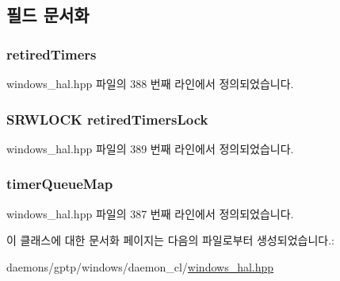 \subsection{필드 문서화}
\subsubsection[{\texorpdfstring{retired\+Timers}{retiredTimers}}]{ retired\+Timers\hspace{0.3cm}{\ttfamily [private]}}\hypertarget{class_windows_timer_queue_a1d247e5dc6ff5761a49ce7376ae9277d}{}\label{class_windows_timer_queue_a1d247e5dc6ff5761a49ce7376ae9277d}


windows\+\_\+hal.\+hpp 파일의 388 번째 라인에서 정의되었습니다.

\subsubsection[{\texorpdfstring{retired\+Timers\+Lock}{retiredTimersLock}}]{\setlength{\rightskip}{0pt plus 5cm}S\+R\+W\+L\+O\+CK retired\+Timers\+Lock\hspace{0.3cm}{\ttfamily [private]}}\hypertarget{class_windows_timer_queue_a756b0f925bf4252e4b3782fb2eb179f4}{}\label{class_windows_timer_queue_a756b0f925bf4252e4b3782fb2eb179f4}


windows\+\_\+hal.\+hpp 파일의 389 번째 라인에서 정의되었습니다.

\subsubsection[{\texorpdfstring{timer\+Queue\+Map}{timerQueueMap}}]{ timer\+Queue\+Map\hspace{0.3cm}{\ttfamily [private]}}\hypertarget{class_windows_timer_queue_a42c6710e44f775bc9ad0df4aa1dd4fa8}{}\label{class_windows_timer_queue_a42c6710e44f775bc9ad0df4aa1dd4fa8}


windows\+\_\+hal.\+hpp 파일의 387 번째 라인에서 정의되었습니다.



이 클래스에 대한 문서화 페이지는 다음의 파일로부터 생성되었습니다.\+:\begin{DoxyCompactItemize}
\item 
daemons/gptp/windows/daemon\+\_\+cl/\hyperlink{windows__hal_8hpp}{windows\+\_\+hal.\+hpp}\end{DoxyCompactItemize}
